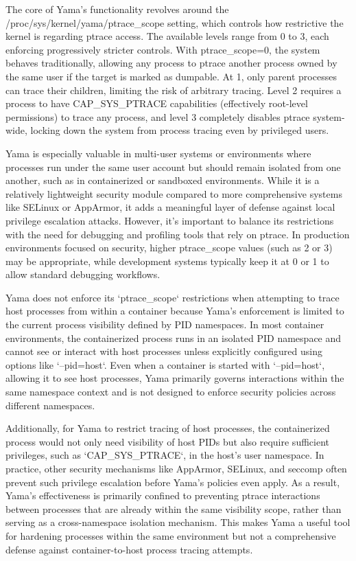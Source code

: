 \documentclass[12pt]{report}
\begin{document}
\begin{doublespace}
The core of Yama’s functionality revolves around the /proc/sys/kernel/yama/ptrace\_scope setting, which controls how restrictive the kernel is regarding ptrace access. The available levels range from 0 to 3, each enforcing progressively stricter controls. With ptrace\_scope=0, the system behaves traditionally, allowing any process to ptrace another process owned by the same user if the target is marked as dumpable. At 1, only parent processes can trace their children, limiting the risk of arbitrary tracing. Level 2 requires a process to have CAP\_SYS\_PTRACE capabilities (effectively root-level permissions) to trace any process, and level 3 completely disables ptrace system-wide, locking down the system from process tracing even by privileged users.

Yama is especially valuable in multi-user systems or environments where processes run under the same user account but should remain isolated from one another, such as in containerized or sandboxed environments. While it is a relatively lightweight security module compared to more comprehensive systems like SELinux or AppArmor, it adds a meaningful layer of defense against local privilege escalation attacks. However, it’s important to balance its restrictions with the need for debugging and profiling tools that rely on ptrace. In production environments focused on security, higher ptrace\_scope values (such as 2 or 3) may be appropriate, while development systems typically keep it at 0 or 1 to allow standard debugging workflows.

Yama does not enforce its `ptrace\_scope` restrictions when attempting to trace host processes from within a container because Yama’s enforcement is limited to the current process visibility defined by PID namespaces. In most container environments, the containerized process runs in an isolated PID namespace and cannot see or interact with host processes unless explicitly configured using options like `--pid=host`. Even when a container is started with `--pid=host`, allowing it to see host processes, Yama primarily governs interactions within the same namespace context and is not designed to enforce security policies across different namespaces.

Additionally, for Yama to restrict tracing of host processes, the containerized process would not only need visibility of host PIDs but also require sufficient privileges, such as `CAP\_SYS\_PTRACE`, in the host’s user namespace. In practice, other security mechanisms like AppArmor, SELinux, and seccomp often prevent such privilege escalation before Yama’s policies even apply. As a result, Yama’s effectiveness is primarily confined to preventing ptrace interactions between processes that are already within the same visibility scope, rather than serving as a cross-namespace isolation mechanism. This makes Yama a useful tool for hardening processes within the same environment but not a comprehensive defense against container-to-host process tracing attempts.



\end{doublespace}
\end{document}
